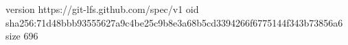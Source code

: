 version https://git-lfs.github.com/spec/v1
oid sha256:71d48bbb93555627a9c4be25c9b8e3a68b5cd3394266f6775144f343b73856a6
size 696
